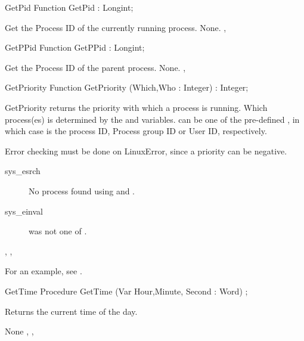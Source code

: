 \html{}
\begin{function}{GetPid}
\Declaration
Function GetPid  : Longint;

\Description
 Get the Process ID of the currently running process.
\Errors
None.
\SeeAlso
{}, 
\end{function}
\html{}
\begin{function}{GetPPid}
\Declaration
Function GetPPid  : Longint;

\Description
 Get the Process ID of the parent process.
\Errors
None.
\SeeAlso
{}, 
\end{function}
\html{}
\begin{function}{GetPriority}
\Declaration
Function GetPriority (Which,Who : Integer) : Integer;

\Description

GetPriority returns the priority with which a process is running.
Which process(es) is determined by the  and  variables.
 can be one of the pre-defined , in which case  is the process ID, Process group ID or
User ID, respectively.

\Errors

 Error checking must be done on LinuxError, since a priority can be negative.
 \begin{description}
 \item[sys\_esrch] No process found using  and .
 \item[sys\_einval]  was not one of .
 \end{description}
 
\SeeAlso
{}, , 
\end{function}
For an example, see .
\begin{procedure}{GetTime}
\Declaration
Procedure GetTime  (Var Hour,Minute, Second : Word) ;

\Description

Returns the current time of the day.

\Errors
None
\SeeAlso
{}, ,  
\end{procedure}
